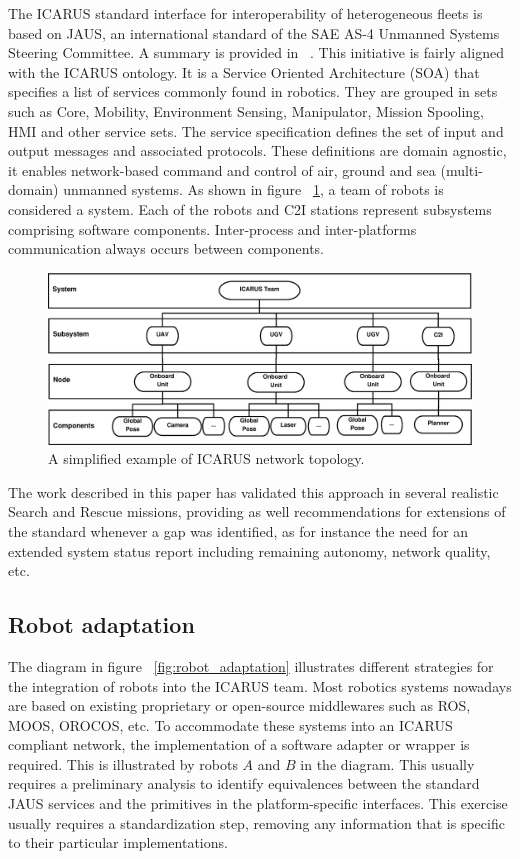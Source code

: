 \documentclass{article}
\begin{document}
The ICARUS standard interface for interoperability of heterogeneous fleets is based on JAUS, an international standard of the SAE AS-4 Unmanned Systems Steering Committee. A summary is provided in ~\cite{serrano_jaus}. This initiative is fairly aligned with the ICARUS ontology. It is a Service Oriented Architecture (SOA) that specifies a list of services commonly found in robotics.  They are grouped in sets such as Core, Mobility, Environment Sensing, Manipulator, Mission Spooling, HMI and other service sets. The service specification defines the set of input and output messages and associated protocols. These definitions are domain agnostic, it enables network-based command and control of air, ground and sea (multi-domain) unmanned systems. As shown in figure ~\ref{fig:icarus_topology}, a team of robots is considered a system. Each of the robots and C2I stations represent subsystems comprising software components. Inter-process and inter-platforms communication always occurs between components.
\begin{figure}
    \centering
    \includegraphics[trim=0cm 0cm 0cm 0cm, width=\textwidth]{ROB-15-0035_fig1.eps}
    \caption{A simplified example of ICARUS network topology.}
    \label{fig:icarus_topology}
\end{figure}

The work described in this paper has validated this approach in several realistic Search and Rescue missions, providing as well recommendations for extensions of the standard whenever a gap was identified, as for instance the need for an extended system status report including remaining autonomy, network quality, etc.

\subsection{Robot adaptation}
The diagram in figure ~\ref{fig:robot_adaptation} illustrates different strategies for the integration of robots into the ICARUS team. Most robotics systems nowadays are based on existing proprietary or open-source middlewares such as ROS, MOOS, OROCOS, etc. To accommodate these systems into an ICARUS compliant network, the implementation of a software adapter or wrapper is required. This is illustrated by robots $A$ and $B$ in the diagram. This usually requires a preliminary analysis to identify equivalences between the standard JAUS services and the primitives in the platform-specific interfaces. This exercise usually requires a standardization step, removing any information that is specific to their particular implementations.
\end{document}
